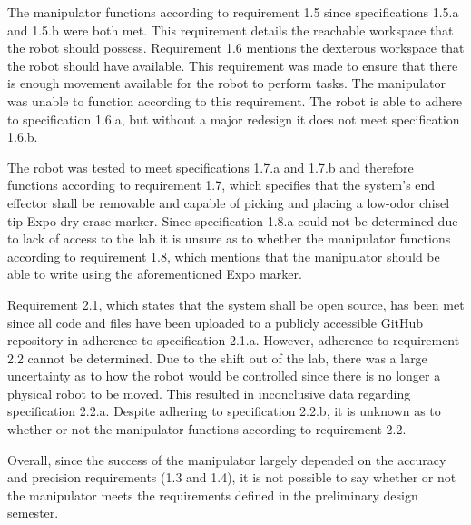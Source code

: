 The manipulator functions according to requirement 1.5 since specifications 1.5.a and 1.5.b were both met. This requirement details the reachable workspace that the robot should possess. Requirement 1.6 mentions the dexterous workspace that the robot should have available. This requirement was made to ensure that there is enough movement available for the robot to perform tasks. The manipulator was unable to function according to this requirement. The robot is able to adhere to specification 1.6.a, but without a major redesign it does not meet specification 1.6.b.

The robot was tested to meet specifications 1.7.a and 1.7.b and therefore functions according to requirement 1.7, which specifies that the system’s end effector shall be removable and capable of picking and placing a low-odor chisel tip Expo dry erase marker. Since specification 1.8.a could not be determined due to lack of access to the lab it is unsure as to whether the manipulator functions according to requirement 1.8, which mentions that the manipulator should be able to write using the aforementioned Expo marker.

Requirement 2.1, which states that the system shall be open source, has been met since all code and files have been uploaded to a publicly accessible GitHub repository in adherence to specification 2.1.a. However, adherence to requirement 2.2 cannot be determined. Due to the shift out of the lab, there was a large uncertainty as to how the robot would be controlled since there is no longer a physical robot to be moved. This resulted in inconclusive data regarding specification 2.2.a. Despite adhering to specification 2.2.b,  it is unknown as to whether or not the manipulator functions according to requirement 2.2.

Overall, since the success of the manipulator largely depended on the accuracy and precision requirements (1.3 and 1.4), it is not possible to say whether or not the manipulator meets the requirements defined in the preliminary design semester.


% 
% 
% 
